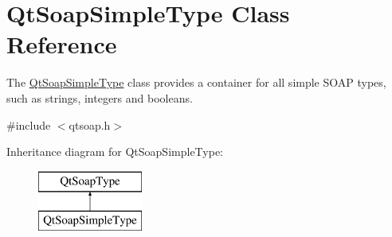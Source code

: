 \hypertarget{class_qt_soap_simple_type}{}\section{Qt\+Soap\+Simple\+Type Class Reference}
\label{class_qt_soap_simple_type}


The \mbox{\hyperlink{class_qt_soap_simple_type}{Qt\+Soap\+Simple\+Type}} class provides a container for all simple S\+O\+AP types, such as strings, integers and booleans.  




{\ttfamily \#include $<$qtsoap.\+h$>$}

Inheritance diagram for Qt\+Soap\+Simple\+Type\+:\begin{figure}[H]
\begin{center}
\leavevmode
\includegraphics[height=2.000000cm]{class_qt_soap_simple_type}
\end{center}
\end{figure}
